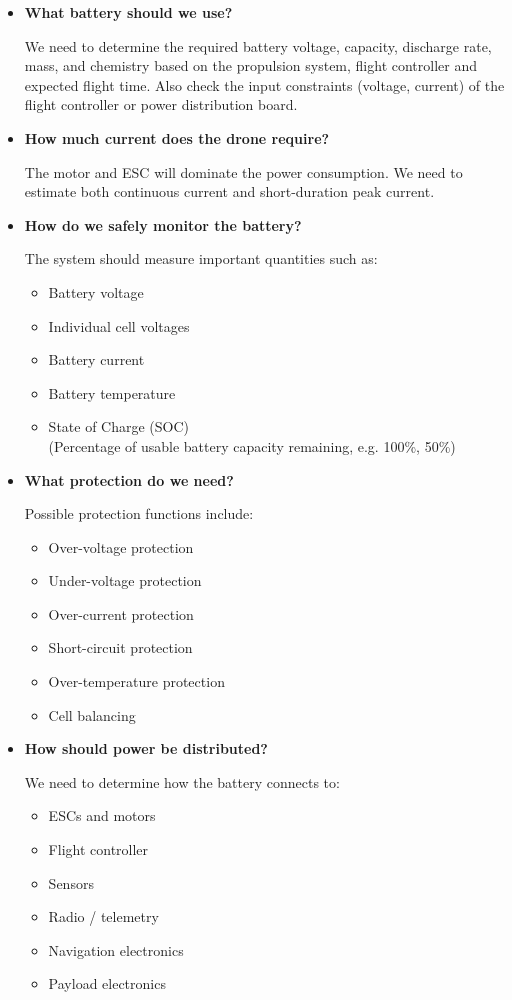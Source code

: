 \documentclass{article}
\begin{document}
\begin{itemize}

\item \textbf{What battery should we use?}

We need to determine the required battery voltage, capacity, discharge rate, mass, and chemistry based on the propulsion system, flight controller and expected flight time.  Also check the input constraints (voltage, current) of the flight controller or power distribution board.

\item \textbf{How much current does the drone require?}

The motor and ESC will dominate the power consumption. We need to estimate both continuous current and short-duration peak current.

\item \textbf{How do we safely monitor the battery?}

The system should measure important quantities such as:
\begin{itemize}
    \item Battery voltage
    \item Individual cell voltages
    \item Battery current
    \item Battery temperature
    \item State of Charge (SOC) \\
    (Percentage of usable battery capacity remaining, e.g. 100\%, 50\%)
\end{itemize}

\item \textbf{What protection do we need?}

Possible protection functions include:
\begin{itemize}
    \item Over-voltage protection
    \item Under-voltage protection
    \item Over-current protection
    \item Short-circuit protection
    \item Over-temperature protection
    \item Cell balancing
\end{itemize}

\item \textbf{How should power be distributed?}

We need to determine how the battery connects to:
\begin{itemize}
    \item ESCs and motors
    \item Flight controller
    \item Sensors
    \item Radio / telemetry
    \item Navigation electronics
    \item Payload electronics
\end{itemize}


\end{itemize}
\end{document}
